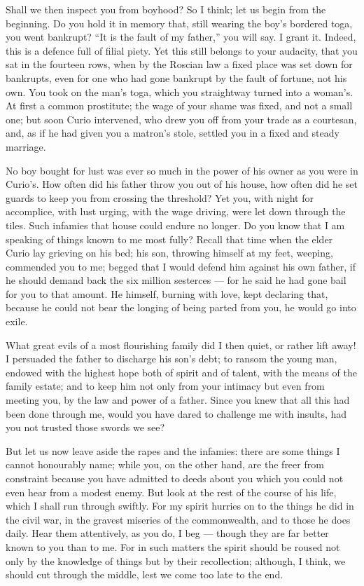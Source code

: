  Shall we then inspect you from boyhood? So I think; let us begin from the beginning. Do you hold it in memory that, still wearing the boy's bordered toga, you went bankrupt? ``It is the fault of my father,'' you will say. I grant it. Indeed, this is a defence full of filial piety. Yet this still belongs to your audacity, that you sat in the fourteen rows, when by the Roscian law a fixed place was set down for bankrupts, even for one who had gone bankrupt by the fault of fortune, not his own. You took on the man's toga, which you straightway turned into a woman's. At first a common prostitute; the wage of your shame was fixed, and not a small one; but soon Curio intervened, who drew you off from your trade as a courtesan, and, as if he had given you a matron's stole, settled you in a fixed and steady marriage.

 No boy bought for lust was ever so much in the power of his owner as you were in Curio's. How often did his father throw you out of his house, how often did he set guards to keep you from crossing the threshold? Yet you, with night for accomplice, with lust urging, with the wage driving, were let down through the tiles. Such infamies that house could endure no longer. Do you know that I am speaking of things known to me most fully? Recall that time when the elder Curio lay grieving on his bed; his son, throwing himself at my feet, weeping, commended you to me; begged that I would defend him against his own father, if he should demand back the six million sesterces --- for he said he had gone bail for you to that amount. He himself, burning with love, kept declaring that, because he could not bear the longing of being parted from you, he would go into exile.

 What great evils of a most flourishing family did I then quiet, or rather lift away! I persuaded the father to discharge his son's debt; to ransom the young man, endowed with the highest hope both of spirit and of talent, with the means of the family estate; and to keep him not only from your intimacy but even from meeting you, by the law and power of a father. Since you knew that all this had been done through me, would you have dared to challenge me with insults, had you not trusted those swords we see?

 But let us now leave aside the rapes and the infamies: there are some things I cannot honourably name; while you, on the other hand, are the freer from constraint because you have admitted to deeds about you which you could not even hear from a modest enemy. But look at the rest of the course of his life, which I shall run through swiftly. For my spirit hurries on to the things he did in the civil war, in the gravest miseries of the commonwealth, and to those he does daily. Hear them attentively, as you do, I beg --- though they are far better known to you than to me. For in such matters the spirit should be roused not only by the knowledge of things but by their recollection; although, I think, we should cut through the middle, lest we come too late to the end.

